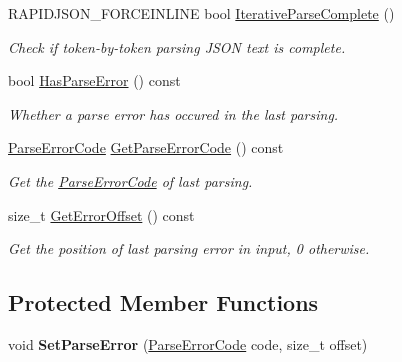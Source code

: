 \begin{DoxyCompactItemize}
R\+A\+P\+I\+D\+J\+S\+O\+N\+\_\+\+F\+O\+R\+C\+E\+I\+N\+L\+I\+NE bool \hyperlink{a02220_a835802fb87b44a09a8184785ed3b9213}{Iterative\+Parse\+Complete} ()
\begin{DoxyCompactList}\small\item\em Check if token-\/by-\/token parsing J\+S\+ON text is complete. \end{DoxyCompactList}\item 
\mbox{\label{a02220_ac417441794477ea747b63adb6d3653a9}} 
bool \hyperlink{a02220_ac417441794477ea747b63adb6d3653a9}{Has\+Parse\+Error} () const
\begin{DoxyCompactList}\small\item\em Whether a parse error has occured in the last parsing. \end{DoxyCompactList}\item 
\mbox{\label{a02220_a937bf90919f50e1c370b312cee5833e8}} 
\hyperlink{a00635_ga8d4b32dfc45840bca189ade2bbcb6ba7}{Parse\+Error\+Code} \hyperlink{a02220_a937bf90919f50e1c370b312cee5833e8}{Get\+Parse\+Error\+Code} () const
\begin{DoxyCompactList}\small\item\em Get the \hyperlink{a00635_ga8d4b32dfc45840bca189ade2bbcb6ba7}{Parse\+Error\+Code} of last parsing. \end{DoxyCompactList}\item 
\mbox{\label{a02220_ae9008523ccd06d839a57335835cb4091}} 
size\+\_\+t \hyperlink{a02220_ae9008523ccd06d839a57335835cb4091}{Get\+Error\+Offset} () const
\begin{DoxyCompactList}\small\item\em Get the position of last parsing error in input, 0 otherwise. \end{DoxyCompactList}\end{DoxyCompactItemize}
\subsection*{Protected Member Functions}
\begin{DoxyCompactItemize}
\item 
\mbox{\label{a02220_ae50079444295bf109730c3b708a818a6}} 
void {\bfseries Set\+Parse\+Error} (\hyperlink{a00635_ga8d4b32dfc45840bca189ade2bbcb6ba7}{Parse\+Error\+Code} code, size\+\_\+t offset)
\end{DoxyCompactItemize}


